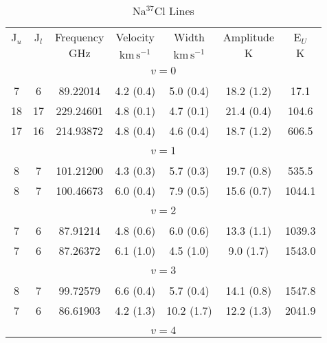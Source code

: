 \begin{table*}[htp]
\centering
\caption{Na$^{37}$Cl Lines}
\begin{tabular}{ccccccc}
\label{tab:Na37Cl_salt_lines}
 J$_u$ & J$_l$ & Frequency & Velocity & Width & Amplitude & E$_U$ \\
  &  & $\mathrm{GHz}$ & $\mathrm{km\,s^{-1}}$ & $\mathrm{km\,s^{-1}}$ & $\mathrm{K}$ & $\mathrm{K}$ \\
\hline
&\vspace{-0.75em}\\
\multicolumn{7}{c}{$v = 0$} \\
\vspace{-0.75em}\\
 7 & 6 & 89.22014 & 4.2 (0.4) & 5.0 (0.4) & 18.2 (1.2) & 17.1 \\
 18 & 17 & 229.24601 & 4.8 (0.1) & 4.7 (0.1) & 21.4 (0.4) & 104.6 \\
 17 & 16 & 214.93872 & 4.8 (0.4) & 4.6 (0.4) & 18.7 (1.2) & 606.5 \\
&\vspace{-0.75em}\\
\multicolumn{7}{c}{$v = 1$} \\
\vspace{-0.75em}\\
 8 & 7 & 101.21200 & 4.3 (0.3) & 5.7 (0.3) & 19.7 (0.8) & 535.5 \\
 8 & 7 & 100.46673 & 6.0 (0.4) & 7.9 (0.5) & 15.6 (0.7) & 1044.1 \\
&\vspace{-0.75em}\\
\multicolumn{7}{c}{$v = 2$} \\
\vspace{-0.75em}\\
 7 & 6 & 87.91214 & 4.8 (0.6) & 6.0 (0.6) & 13.3 (1.1) & 1039.3 \\
 7 & 6 & 87.26372 & 6.1 (1.0) & 4.5 (1.0) & 9.0 (1.7) & 1543.0 \\
&\vspace{-0.75em}\\
\multicolumn{7}{c}{$v = 3$} \\
\vspace{-0.75em}\\
 8 & 7 & 99.72579 & 6.6 (0.4) & 5.7 (0.4) & 14.1 (0.8) & 1547.8 \\
 7 & 6 & 86.61903 & 4.2 (1.3) & 10.2 (1.7) & 12.2 (1.3) & 2041.9 \\
&\vspace{-0.75em}\\
\multicolumn{7}{c}{$v = 4$} \\

\end{tabular}
\end{table*}
